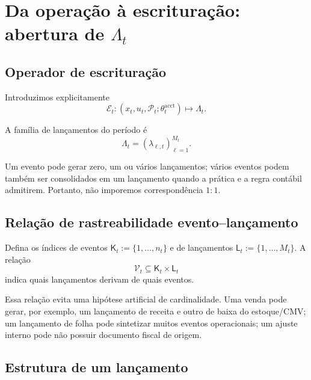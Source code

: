 \documentclass[11pt,a4paper]{article}
\newcommand{\Plano}{\mathcal{P}}
\newcommand{\cE}{\mathcal{E}}
\begin{document}
\section[Da operação à escrituração: abertura da camada de lançamentos]{Da operação à escrituração: abertura de $\Lambda_t$}

\subsection{Operador de escrituração}

Introduzimos explicitamente
\begin{equation}
\boxed{
\cE_t:
(x_t,u_t,\Plano_t;\theta_t^{\mathrm{acct}})
\longmapsto
\Lambda_t.
}
\label{eq:bookkeeping-operator}
\end{equation}

A família de lançamentos do período é
\begin{equation}
\boxed{
\Lambda_t=(\lambda_{\ell,t})_{\ell=1}^{M_t}.
}
\end{equation}

Um evento pode gerar zero, um ou vários lançamentos; vários eventos podem também ser consolidados em um lançamento quando a prática e a regra contábil admitirem. Portanto, não imporemos correspondência $1:1$.

\subsection{Relação de rastreabilidade evento--lançamento}

Defina os índices de eventos $\mathsf K_t:=\{1,\ldots,n_t\}$ e de lançamentos $\mathsf L_t:=\{1,\ldots,M_t\}$. A relação
\begin{equation}
\boxed{
\mathcal V_t\subseteq \mathsf K_t\times\mathsf L_t
}
\label{eq:event-entry-link}
\end{equation}
indica quais lançamentos derivam de quais eventos.

\begin{intuicao}
Essa relação evita uma hipótese artificial de cardinalidade. Uma venda pode gerar, por exemplo, um lançamento de receita e outro de baixa do estoque/CMV; um lançamento de folha pode sintetizar muitos eventos operacionais; um ajuste interno pode não possuir documento fiscal de origem.
\end{intuicao}

\subsection{Estrutura de um lançamento}
\end{document}
